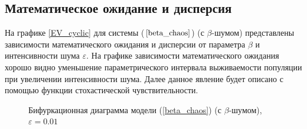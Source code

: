 \subsection{Математическое ожидание и дисперсия}

    На графике \ref{EV_cyclic} для системы (\(\ref{beta_chaos}\)) (с \(\beta\)-шумом) представлены зависимости математического ожидания и дисперсии от параметра \(\beta\) и интенсивности шума \(\varepsilon\). На графике зависимости математического ожидания хорошо видно уменьшение параметрического интервала выживаемости популяции при увеличении интенсивности шума. Далее данное явление будет описано с помощью функции стохастической чувствительности.

    \begin{figure}
        \centering
        
        \caption{Бифуркационная диаграмма модели (\ref{beta_chaos}) (с \(\beta\)-шумом), \(\varepsilon = 0.01\)}
    \end{figure}
        
        
